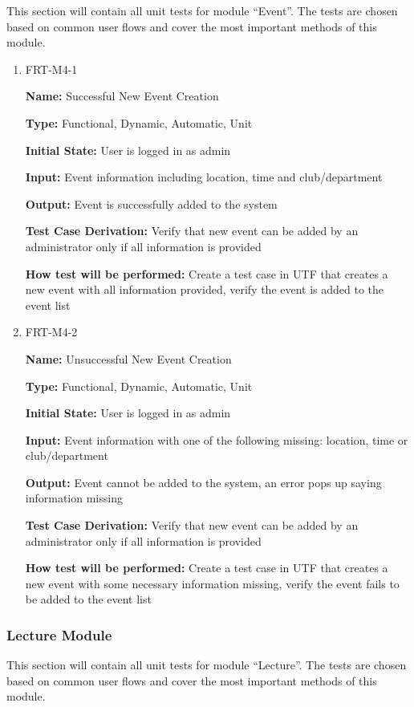 \documentclass[12pt, titlepage]{article}
\begin{document}
This section will contain all unit tests for module ``Event''. The tests are chosen based on common user flows and cover the most important methods of this module.

\begin{enumerate}
\item{FRT-M4-1}

\textbf{Name:} Successful New Event Creation

\textbf{Type:} Functional, Dynamic, Automatic, Unit
					
\textbf{Initial State:} User is logged in as admin
					
\textbf{Input:} Event information including location, time and club/department
					
\textbf{Output:} Event is successfully added to the system

\textbf{Test Case Derivation:} Verify that new event can be added by an administrator only if all information is provided

\textbf{How test will be performed:} Create a test case in UTF that creates a new event with all information provided, verify the event is added to the event list

\item{FRT-M4-2}

\textbf{Name:} Unsuccessful New Event Creation

\textbf{Type:} Functional, Dynamic, Automatic, Unit
					
\textbf{Initial State:} User is logged in as admin
					
\textbf{Input:} Event information with one of the following missing: location, time or club/department
					
\textbf{Output:} Event cannot be added to the system, an error pops up saying information missing

\textbf{Test Case Derivation:} Verify that new event can be added by an administrator only if all information is provided

\textbf{How test will be performed:} Create a test case in UTF that creates a new event with some necessary information missing, verify the event fails to be added to the event list
\end{enumerate}

\subsubsection{Lecture Module}

This section will contain all unit tests for module ``Lecture''. The tests are chosen based on common user flows and cover the most important methods of this module.
\end{document}
